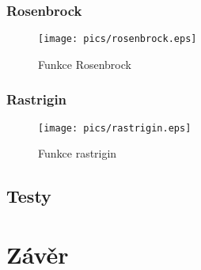 \documentclass[12pt,a4paper,fleqn]{article}
\begin{document}
\subsubsection*{Rosenbrock}
\blindtext
\begin{figure*}[h]
\centering
\texttt{[image: pics/rosenbrock.eps]}
\caption{Funkce Rosenbrock}
\end{figure*}

\subsubsection*{Rastrigin}
\blindtext
\begin{figure*}[h]
\centering
\texttt{[image: pics/rastrigin.eps]}
\caption{Funkce rastrigin}
\end{figure*}

\subsection{Testy}
\blindtext

\section{Závěr} \label{zaver}
\blindtext


  \begin{flushleft}
  \end{flushleft}

\newpage
\appendix
\end{document}
